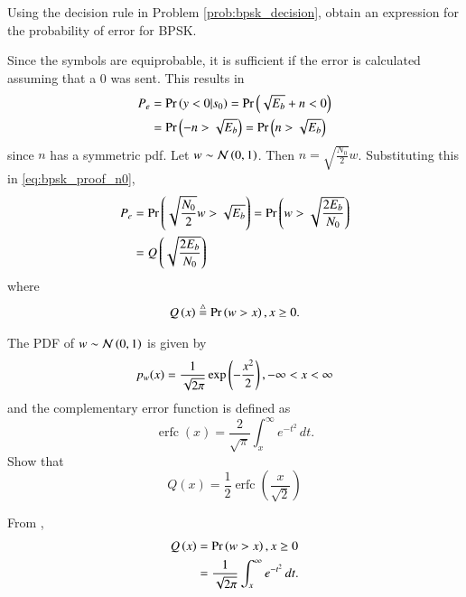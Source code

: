\documentclass[journal,12pt,twocolumn]{IEEEtran}
\begin{document}
\begin{problem}
Using the decision rule in Problem \ref{prob:bpsk_decision}, obtain an expression for the probability of error for BPSK.
\end{problem}
\solution
Since the symbols are equiprobable, it is sufficient if the error is calculated assuming that a 0 was sent.  This results in
\begin{align}
P_e &= \Pr\left(y < 0|s_0\right) = \Pr\left(\sqrt{E_b} + n < 0\right)
\\
&= \Pr\left( -n > \sqrt{E_b} \right) = \Pr\left( n > \sqrt{E_b} \right)
\label{eq:bpsk_proof_n0}
\end{align}
since $n$ has a symmetric pdf.
Let $w \sim \mathcal{N}\left(0,1\right)$.  Then $n = \sqrt{\frac{N_0}{2}}w$. Substituting this in \eqref{eq:bpsk_proof_n0},
\begin{align}
P_e &=  \Pr\left( \sqrt{\frac{N_0}{2}}w > \sqrt{E_b} \right) = \Pr\left( w > \sqrt{\frac{2E_b}{N_0}} \right)
\\
&= Q\left(\sqrt{\frac{2E_b}{N_0}}\right)
\end{align}
%
where 
\begin{align}
\label{eq:qfunc_def}
Q\left(x\right) \stackrel{\triangle}{=} \Pr\left(w > x\right), x \ge 0 .
\end{align}
\begin{problem}
The PDF of $w \sim \mathcal{N}\left(0,1\right)$ is given by
%
\begin{equation}
p_{w}(x) = \frac{1}{\sqrt{2\pi}}\exp\left(-\frac{x^2}{2}\right), -\infty < x < \infty
\end{equation}
and the complementary error function is defined as
\begin{equation}
\operatorname {erfc} (x)={\frac {2}{\sqrt {\pi }}}\int _{x}^{\infty }e^{-t^{2}}\,dt.
\end{equation}
%
Show that 
\begin{equation}
Q(x) = \frac{1}{2}\operatorname {erfc}\left({\frac  {x}{{\sqrt  {2}}}}\right)
\end{equation}
\end{problem}
\solution From \label{eq:qfunc_def},
\begin{align}
Q\left(x\right)& = \Pr\left(w > x\right), x \ge 0 
\\
&= \frac {1}{\sqrt {2\pi }}\int _{x}^{\infty }e^{-t^{2}}\,dt.
\end{align}
\end{document}
